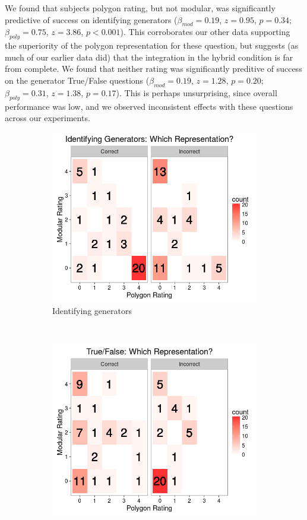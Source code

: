 \documentclass[man,10pt]{apa6}
\begin{document}
We found that subjects polygon rating, but not modular, was significantly predictive of success on identifying generators ($\beta_{mod} = 0.19$, $z = 0.95$, $p = 0.34$; $\beta_{poly} = 0.75$, $z = 3.86$, $p < 0.001$). This corroborates our other data supporting the superiority of the polygon representation for these question, but suggests (as much of our earlier data did) that the integration in the hybrid condition is far from complete. We found that neither rating was significantly preditive of success on the generator True/False questions ($\beta_{mod} = 0.19$, $z = 1.28$, $p = 0.20$; $\beta_{poly} = 0.31$, $z = 1.38$, $p = 0.17$). This is perhaps unsurprising, since overall performance was low, and we observed inconsistent effects with these questions across our experiments.\\
\begin{figure}
\centering
\begin{subfigure}[c]{0.45\textwidth}
\centering 
\includegraphics[width=\textwidth]{figures/3/wr_genT.png}
\caption{Identifying generators}
\end{subfigure}
~
\begin{subfigure}[c]{0.45\textwidth}
\centering 
\includegraphics[width=\textwidth]{figures/3/wr_genTF.png}

\end{subfigure}
\end{figure}
\end{document}

